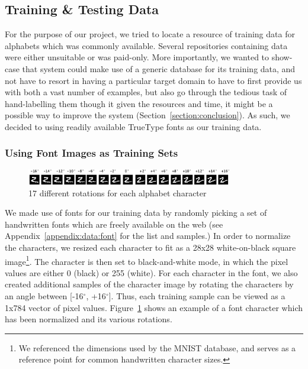 \documentclass[12pt]{article}
\newcommand{\degree}{\ensuremath{^\circ}}
\begin{document}
	\subsection{Training \& Testing Data}
	For the purpose of our project, we tried to locate a resource of training data for alphabets which was commonly available. Several repositories containing data were either unsuitable or was paid-only. More importantly, we wanted to show-case that system could make use of a generic database for its training data, and not have to resort in having a particular target domain to have to first provide us with both a vast number of examples, but also go through the tedious task of hand-labelling them though it given the resources and time, it might be a possible way to improve the system (Section~\ref{section:conclusion}). As such, we decided to using readily available TrueType fonts as our training data.
			
		\subsubsection{Using Font Images as Training Sets}
		
		\begin{figure}[htbp!]
		\centering
		\includegraphics[width=0.8\textwidth]{training_data.eps}
		\caption{17 different rotations for each alphabet character}
		\label{figure:training_data}
		\end{figure}
		
		We made use of fonts for our training data by randomly picking a set of handwritten fonts which are freely available on the web (see Appendix~\ref{appendix:data:font} for the list and samples.) In order to normalize the characters, we resized each character to fit as a 28x28 white-on-black square image\footnote{We referenced the dimensions used by the MNIST database, and serves as a reference point for common handwritten character sizes.}. The character is then set to black-and-white mode, in which the pixel values are either 0 (black) or 255 (white). For each character in the font, we also created additional samples of the character image by rotating the characters by an angle between [-16\degree, +16\degree]. Thus, each training sample can be viewed as a 1x784 vector of pixel values. Figure~\ref{figure:training_data} shows an example of a font character which has been normalized and its various rotations.	
	
\end{document}
